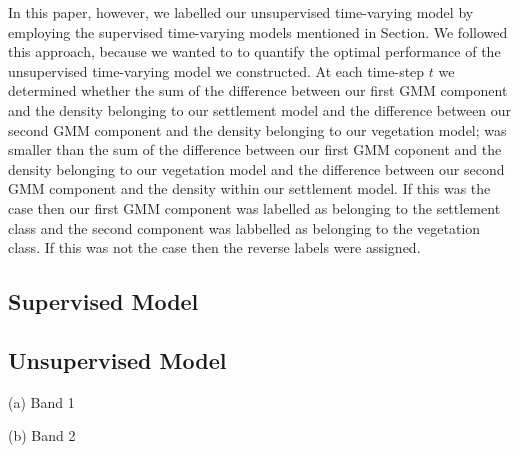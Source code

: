 \documentclass{article}
\begin{document}
In this paper, however, we labelled our unsupervised time-varying model by employing the supervised time-varying models mentioned in Section. We followed this approach, because 
we wanted to to quantify the optimal performance of the unsupervised time-varying model we constructed. At each time-step $t$ we 
determined whether the sum of the difference between our first GMM component and the density belonging to our settlement model and the difference 
between our second GMM component and the density belonging to our vegetation model; was smaller than the sum of the difference between our first GMM coponent and the density 
belonging to our vegetation model and the difference between our second GMM component and the density within our settlement model. If this was the case then our first GMM component 
was labelled as belonging to the settlement class and the second component was labbelled as belonging to the vegetation class. If this was not the case then 
the reverse labels were assigned.

% 



\subsection{Supervised Model}

\subsection{Unsupervised Model}

\begin{minipage}[b]{.47\linewidth}
  \centering 
  \centerline{}
  \centerline{(a) Band 1}\medskip
\end{minipage}
\hfill
\begin{minipage}[b]{0.47\linewidth}
  \centering
  \centerline{}
  \centerline{(b) Band 2}\medskip
\end{minipage}
\end{document}
